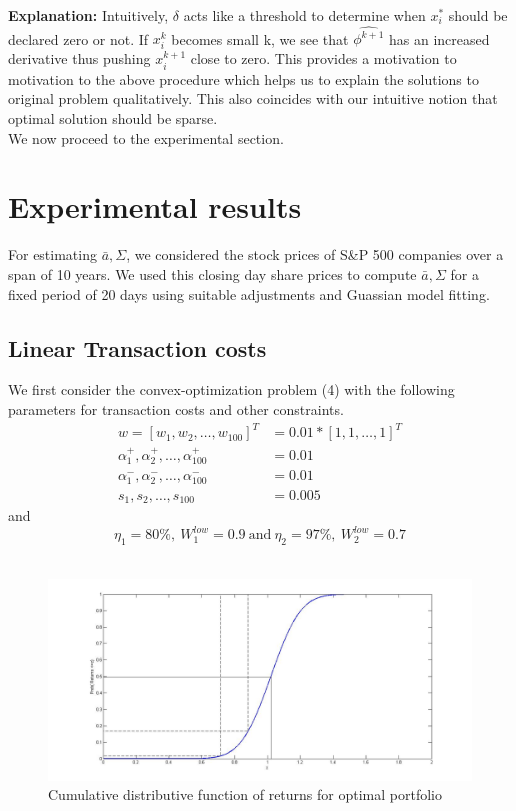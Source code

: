 \documentclass[a4paper]{article}
\begin{document}
\textbf{Explanation:} Intuitively, $\delta$ acts like a threshold to determine when $x_i^*$ should be declared zero or not. If $x_i^k$ becomes small k, we see that $\hat{\phi^{k+1}}$ has an increased derivative thus pushing $x_i^{k+1}$ close to zero. This provides a motivation to motivation to the above procedure which helps us to explain the solutions to original problem qualitatively. This also coincides with our intuitive notion that optimal solution should be sparse.\\[0.2em]

We now proceed to the experimental section.

\section{Experimental results}

For estimating $\bar{a},\Sigma$, we considered the stock prices of S\&P 500 companies over a span of 10 years. We used this closing day share prices to compute $\bar{a},\Sigma$ for a fixed period of 20 days using suitable adjustments and Guassian model fitting. 

\subsection{Linear Transaction costs}

We first consider the convex-optimization problem (4) with the following parameters for transaction costs and other constraints.
\begin{align*}
w=[w_1,w_2,\ldots,w_{100}]^T&=0.01*[1,1,\ldots,1]^T\\
\alpha_1^+,\alpha_2^+,\ldots,\alpha_{100}^+ &=0.01\\
\alpha_1^-,\alpha_2^-,\ldots,\alpha_{100}^- &= 0.01\\
s_1,s_2,\ldots,s_{100} &=0.005
\end{align*}
and
$$ \eta_1 = 80 \%,\  W_1^{low}=0.9 \  \text{and} \ \eta_2 = 97\%,\  W_2^{low} =0.7$$
\\
\begin{figure}[h]
\centering
\includegraphics[scale=0.4]{cdf_edited.jpg}
\caption{Cumulative distributive function of returns for optimal portfolio}
\label{fig:1}
\end{figure}
\end{document}
